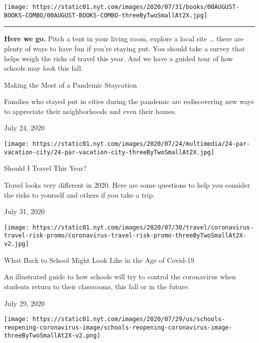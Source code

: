\texttt{[image: https://static01.nyt.com/images/2020/07/31/books/00AUGUST-BOOKS-COMBO/00AUGUST-BOOKS-COMBO-threeByTwoSmallAt2X.jpg]}

\begin{center}\rule{0.5\linewidth}{\linethickness}\end{center}

\textbf{Here we go.} Pitch a tent in your living room, explore a local
site \ldots{} there are plenty of ways to have fun if you're staying
put. You should take a survey that helps weigh the risks of travel this
year. And we have a guided tour of how schools may look this fall.

\href{https://www.nytimes.com/2020/07/24/parenting/summer-staycation-coronavirus.html?action=click\&module=RelatedLinks\&pgtype=collection}{}

Making the Most of a Pandemic Staycation

Families who stayed put in cities during the pandemic are rediscovering
new ways to appreciate their neighborhoods and even their homes.

July 24, 2020

\texttt{[image: https://static01.nyt.com/images/2020/07/24/multimedia/24-par-vacation-city/24-par-vacation-city-threeByTwoSmallAt2X.jpg]}

\href{https://www.nytimes.com/interactive/2020/07/31/travel/coronavirus-travel-risk.html?action=click\&module=RelatedLinks\&pgtype=collection}{}

Should I Travel This Year?

Travel looks very different in 2020. Here are some questions to help you
consider the risks to yourself and others if you take a trip.

July 31, 2020

\texttt{[image: https://static01.nyt.com/images/2020/07/30/travel/coronavirus-travel-risk-promo/coronavirus-travel-risk-promo-threeByTwoSmallAt2X-v2.jpg]}

\href{https://www.nytimes.com/interactive/2020/07/29/us/schools-reopening-coronavirus.html?action=click\&module=RelatedLinks\&pgtype=collection}{}

What Back to School Might Look Like in the Age of Covid-19

An illustrated guide to how schools will try to control the coronavirus
when students return to their classrooms, this fall or in the future.

July 29, 2020

\texttt{[image: https://static01.nyt.com/images/2020/07/29/us/schools-reopening-coronavirus-image/schools-reopening-coronavirus-image-threeByTwoSmallAt2X-v2.png]}

